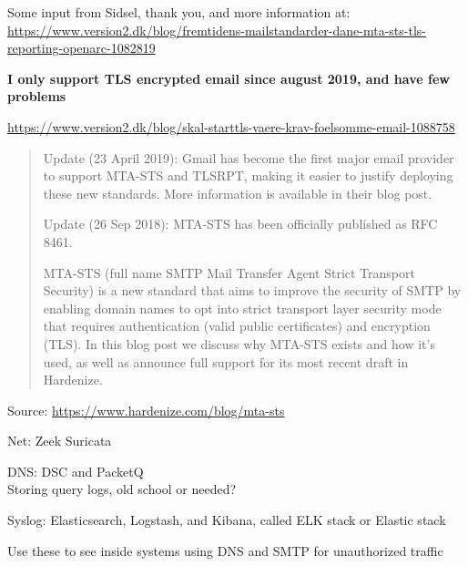\documentclass[Screen16to9,17pt]{foils}
\begin{document}
Some input from Sidsel, thank you, and more information at:\\{\footnotesize
\url{https://www.version2.dk/blog/fremtidens-mailstandarder-dane-mta-sts-tls-reporting-openarc-1082819}}

\vskip 5mm
\centerline{\bf I only support TLS encrypted email since august 2019, and have few problems}
\url{https://www.version2.dk/blog/skal-starttls-vaere-krav-foelsomme-email-1088758}


\begin{quote}
Update (23 April 2019): Gmail has become the first major email provider to support MTA-STS and TLSRPT, making it easier to justify deploying these new standards. More information is available in their blog post.

Update (26 Sep 2018): MTA-STS has been officially published as RFC 8461.

MTA-STS (full name SMTP Mail Transfer Agent Strict Transport Security) is a new standard that aims to improve the security of SMTP by enabling domain names to opt into strict transport layer security mode that requires authentication (valid public certificates) and encryption (TLS). In this blog post we discuss why MTA-STS exists and how it's used, as well as announce full support for its most recent draft in Hardenize.
\end{quote}

Source: \url{https://www.hardenize.com/blog/mta-sts}






\begin{list2}
\item Net: Zeek  Suricata 
\item DNS: DSC and PacketQ \\
Storing query logs, old school or needed?
\item Syslog: Elasticsearch, Logstash, and Kibana, called ELK stack or Elastic stack
\item Use these to see inside systems using DNS and SMTP for unauthorized traffic
\end{list2}

\myquestionspage
\end{document}
